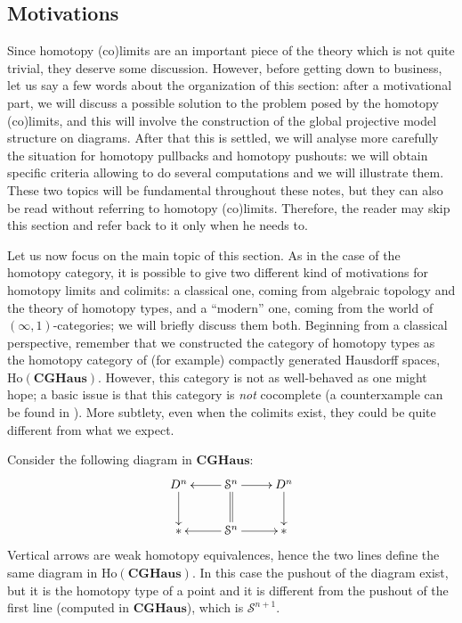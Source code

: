 \begin{refsection}
\subsection{Motivations}

Since homotopy (co)limits are an important piece of the theory which is not quite trivial, they deserve some discussion. However, before getting down to business, let us say a few words about the organization of this section: after a motivational part, we will discuss a possible solution to the problem posed by the homotopy (co)limits, and this will involve the construction of the global projective model structure on diagrams. After that this is settled, we will analyse more carefully the situation for homotopy pullbacks and homotopy pushouts: we will obtain specific criteria allowing to do several computations and we will illustrate them. These two topics will be fundamental throughout these notes, but they can also be read without referring to homotopy (co)limits. Therefore, the reader may skip this section and refer back to it only when he needs to.

Let us now focus on the main topic of this section. As in the case of the homotopy category, it is possible to give two different kind of motivations for homotopy limits and colimits: a classical one, coming from algebraic topology and the theory of homotopy types, and a ``modern'' one, coming from the world of $(\infty,1)$-categories; we will briefly discuss them both. Beginning from a classical perspective, remember that we constructed the category of homotopy types as the homotopy category of (for example) compactly generated Hausdorff spaces, $\mathrm{Ho}(\mathbf{CGHaus})$. However, this category is not as well-behaved as one might hope; a basic issue is that this category is \emph{not} cocomplete (a counterxample can be found in \cite[Example 6.3.3]{riehl}). More subtlety, even when the colimits exist, they could be quite different from what we expect.

\begin{eg} \label{eg sphere suspension}
Consider the following diagram in $\mathbf{CGHaus}$:
\[
\xymatrix{
D^n \ar[d] & \mathcal S^n \ar[l] \ar@{=}[d] \ar[r] & D^n \ar[d] \\
{*} & \mathcal{S}^n \ar[l] \ar[r] & {*}
}
\]
Vertical arrows are weak homotopy equivalences, hence the two lines define the same diagram in $\mathrm{Ho}(\mathbf{CGHaus})$. In this case the pushout of the diagram exist, but it is the homotopy type of a point and it is different from the pushout of the first line (computed in $\mathbf{CGHaus}$), which is $\mathcal S^{n+1}$.
\end{eg}


\end{refsection}

